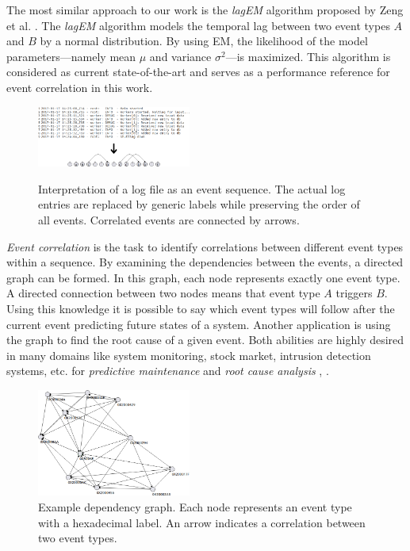 \documentclass[conference]{IEEEtran}
\theoremstyle{examplestyle}
\begin{document}
The most similar approach to our work is the \textit{lagEM} algorithm proposed by Zeng et al. \cite{Zeng2015}. The \textit{lagEM} algorithm models the temporal lag between two event types \(A\) and \(B\) by a normal distribution. By using \ac{EM}, the likelihood of the model parameters---namely mean \(\mu\) and variance \(\sigma^2\)---is maximized. This algorithm is considered as current state-of-the-art and serves as a performance reference for event correlation in this work.

\begin{figure}[!tb]
	\centering
	{
	\includegraphics[width=0.45\textwidth]{images/overview.png}}
	\caption{Interpretation of a log file as an event sequence. The actual log entries are replaced by generic labels while preserving the order of all events. Correlated events are connected by arrows.}
	\label{fig:logToSequence}
\end{figure}


\textit{Event correlation} is the task to identify correlations between different event types within a sequence. By examining the dependencies between the events, a directed graph can be formed. In this graph, each node represents exactly one event type. A directed connection between two nodes means that event type \(A\) triggers \(B\). Using this knowledge it is possible to say which event types will follow after the current event predicting future states of a system. Another application is using the graph to find the root cause of a given event. Both abilities are highly desired in many domains like system monitoring, stock market, intrusion detection systems, etc. for \textit{predictive maintenance} and \textit{root cause analysis} \cite{Zeng2015}, \cite{Benferhat2008}.


\begin{figure}[!tb]
	\centering
	\includegraphics[width=0.45\textwidth]{images/dependency-graph}
	\caption{Example dependency graph. Each node represents an event type with a hexadecimal label. An arrow indicates a  correlation between two event types.}
	\label{fig:exampleDependencyGraph}
\end{figure}
\end{document}
